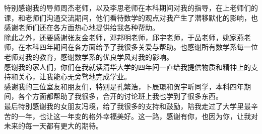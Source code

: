 
\begin{acknowledgements}
  特别感谢我的导师周杰老师，以及李思老师在本科期间对我的指导，在上老师们的课，和老师们沟通交流期间，他们看待数学的观点对我产生了潜移默化的影响，也感谢老师们还在各方面热心地提供给我各种帮助。\\ \indent
  除此之外，还要感谢张友金老师，邓邦明老师，邱宇老师，于品老师，姚家燕老师，在本科四年期间在各方面给予了我很多关爱与帮助。也感谢所有数学系每一位老师对我的教育，感谢数学系的优良学风对我的影响。\\ \indent
  感谢我的家人们，你们在我就读清华大学的四年间一直给我提供物质和精神上的支持和关心，让我能心无旁骛地完成学业。\\ \indent
  感谢我的三位室友和朋友们，特别是孔繁浩，卜辰璟和贺宇昕同学，本科四年期间，各个方面都帮助了我很多，合开的讨论班上我也学到了很多东西。\\ \indent
  最后特别感谢我的女朋友冯境，给了我很多的支持和鼓励，陪我走过了大学里最辛苦的一年，也让这一年变的格外幸福美好。这一路，感谢有你，也因为你，让我对未来的每一天都有更大的期待。
  
\end{acknowledgements}
